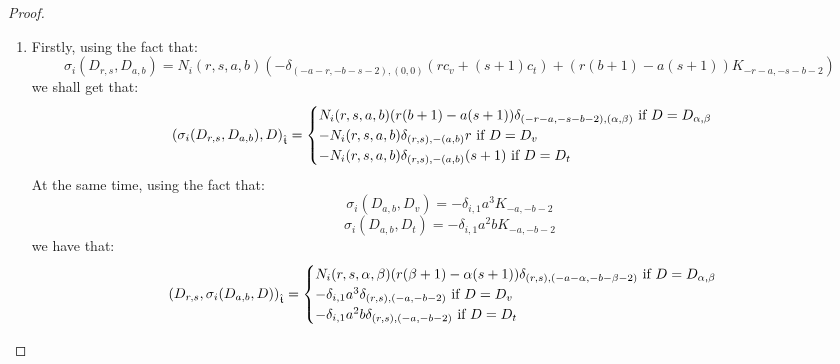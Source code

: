             \begin{proof}
                \begin{enumerate}
                    \item Firstly, using the fact that:
                        $$\sigma_i(D_{r, s}, D_{a, b}) = N_i(r, s, a, b) \left( -\delta_{ (-a - r, -b - s - 2), (0, 0) } (r c_v + (s + 1) c_t) + ( r(b + 1) - a(s + 1) )K_{-r - a, -s - b - 2} \right)$$
                    we shall get that:
                        $$
                            \left( \sigma_i(D_{r, s}, D_{a, b}), D \right)_{\hat{\mathfrak{t}}} =
                            \begin{cases}
                                \text{$N_i(r, s, a, b) ( r(b + 1) - a(s + 1) ) \delta_{(-r - a, -s - b - 2), (\alpha, \beta)}$ if $D = D_{\alpha, \beta}$}
                                \\
                                \text{$-N_i(r, s, a, b) \delta_{(r, s), -(a, b)} r$ if $D = D_v$}
                                \\
                                \text{$-N_i(r, s, a, b) \delta_{(r, s), -(a, b)} (s + 1)$ if $D = D_t$}
                            \end{cases}
                        $$
                    At the same time, using the fact that:
                        $$\sigma_i(D_{a, b}, D_v) = -\delta_{i, 1} a^3 K_{-a, -b - 2}$$
                        $$\sigma_i(D_{a, b}, D_t) = - \delta_{i, 1} a^2b K_{-a, -b - 2}$$
                    we have that:
                        $$
                            \begin{aligned}
                                \left( D_{r, s}, \sigma_i(D_{a, b}, D) \right)_{\hat{\mathfrak{t}}} =
                                \begin{cases}
                                    \text{$N_i(r, s, \alpha, \beta) ( r(\beta + 1) - \alpha(s + 1) ) \delta_{(r, s), (-a - \alpha, -b - \beta - 2)}$ if $D = D_{\alpha, \beta}$}
                                    \\
                                    \text{$-\delta_{i, 1} a^3 \delta_{(r, s), (-a, -b - 2)}$ if $D = D_v$}
                                    \\
                                    \text{$-\delta_{i, 1} a^2 b \delta_{(r, s), (-a, -b - 2)}$ if $D = D_t$}
                                \end{cases}
                            \end{aligned}
                        $$

\end{enumerate}
\end{proof}
